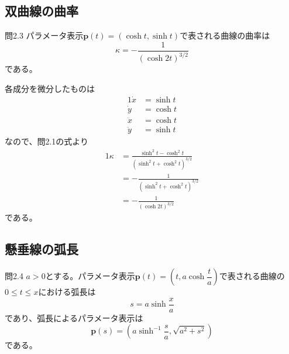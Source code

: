 \documentclass[a4j,disablejfam,dvipdfmx,papersize,slide,uplatex,21pt]{jsarticle}
\makeatletter
\renewenvironment{proof}[1][\proofname]{\par
        \pushQED{\qed}
        \normalfont
        \topsep6\p@\@plus6\p@ \trivlist
        \item[\hskip\labelsep{\bfseries #1}\@addpunct{\bfseries}]\ignorespaces
    }{%
        \popQED\endtrivlist\@endpefalse
    }
\renewcommand{\proofname}{証明.}
\makeatother
\begin{document}
\newpage
\subsection*{双曲線の曲率}
\begin{itembox}[l]{問2.3}
    パラメータ表示$\bm{p}(t) = (\cosh t, \sinh t)$で表される曲線の曲率は
    \begin{equation}
        \kappa = - \frac{1}{(\cosh 2t)^{3/2}}
    \end{equation}
    である。
\end{itembox}

\newpage
\begin{proof}
    各成分を微分したものは
    \begin{alignat}{1}
        \dot{x} &= \sinh t \\
        \dot{y} &= \cosh t \\
        \ddot{x} &= \cosh t \\
        \ddot{y} &= \sinh t
    \end{alignat}
    なので、問2.1の式より
    \begin{alignat}{1}
        \kappa &= \frac{\sinh^2 t - \cosh^2 t}{(\sinh^2 t + \cosh^2 t)^{3/2}} \\
            &= - \frac{1}{(\sinh^2 t + \cosh^2 t)^{3/2}} \\
            &= - \frac{1}{(\cosh 2t)^{3/2}}
    \end{alignat}
    である。
\end{proof}

\newpage
\subsection*{懸垂線の弧長}
\begin{itembox}[l]{問2.4}
    $a > 0$とする。パラメータ表示$\bm{p}(t) = \left(t, a \cosh \dfrac{t}{a} \right)$で表される曲線の
    $0 \le t \le x$における弧長は
    \begin{equation}
        s = a \sinh \frac{x}{a}
    \end{equation}
    であり、弧長によるパラメータ表示は
    \begin{equation}
        \bm{p}(s) = \left(
            a \sinh^{-1} \frac{s}{a},
            \sqrt{a^2 + s^2}
        \right)
    \end{equation}
    である。
\end{itembox}
\end{document}
